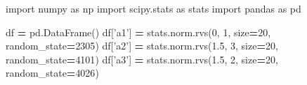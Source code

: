 \documentclass[polish,]{book}
\newenvironment{Shaded}{\begin{snugshade}}{\end{snugshade}}
\newcommand{\DecValTok}[1]{\textcolor[rgb]{0.00,0.00,0.81}{#1}}
\newcommand{\FloatTok}[1]{\textcolor[rgb]{0.00,0.00,0.81}{#1}}
\newcommand{\ImportTok}[1]{#1}
\newcommand{\NormalTok}[1]{#1}
\newcommand{\OperatorTok}[1]{\textcolor[rgb]{0.81,0.36,0.00}{\textbf{#1}}}
\newcommand{\StringTok}[1]{\textcolor[rgb]{0.31,0.60,0.02}{#1}}
\begin{document}
\begin{Shaded}
\begin{Highlighting}[]
\ImportTok{import}\NormalTok{ numpy }\ImportTok{as}\NormalTok{ np}
\ImportTok{import}\NormalTok{ scipy.stats }\ImportTok{as}\NormalTok{ stats}
\ImportTok{import}\NormalTok{ pandas }\ImportTok{as}\NormalTok{ pd}
    
\NormalTok{df }\OperatorTok{=}\NormalTok{ pd.DataFrame()}
\NormalTok{df[}\StringTok{'a1'}\NormalTok{] }\OperatorTok{=}\NormalTok{ stats.norm.rvs(}\DecValTok{0}\NormalTok{, }\DecValTok{1}\NormalTok{, size}\OperatorTok{=}\DecValTok{20}\NormalTok{, random_state}\OperatorTok{=}\DecValTok{2305}\NormalTok{)}
\NormalTok{df[}\StringTok{'a2'}\NormalTok{] }\OperatorTok{=}\NormalTok{ stats.norm.rvs(}\FloatTok{1.5}\NormalTok{, }\DecValTok{3}\NormalTok{, size}\OperatorTok{=}\DecValTok{20}\NormalTok{, random_state}\OperatorTok{=}\DecValTok{4101}\NormalTok{)}
\NormalTok{df[}\StringTok{'a3'}\NormalTok{] }\OperatorTok{=}\NormalTok{ stats.norm.rvs(}\FloatTok{1.5}\NormalTok{, }\DecValTok{2}\NormalTok{, size}\OperatorTok{=}\DecValTok{20}\NormalTok{, random_state}\OperatorTok{=}\DecValTok{4026}\NormalTok{)}


\end{Highlighting}
\end{Shaded}
\end{document}
